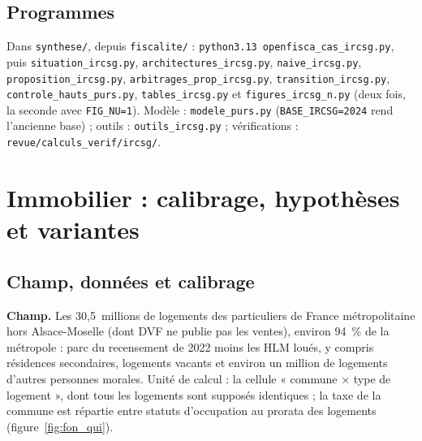 \documentclass[11pt,a4paper]{article}
\begin{document}
\subsection{Programmes}

{\sloppy Dans \texttt{synthese/}, depuis \texttt{fiscalite/} : \texttt{python3.13 openfisca\_cas\_ircsg.py}, puis
\texttt{situation\_ircsg.py}, \texttt{architectures\_ircsg.py}, \texttt{naive\_ircsg.py},
\texttt{proposition\_ircsg.py}, \texttt{arbitrages\_prop\_ircsg.py}, \texttt{transition\_ircsg.py},
\texttt{controle\_hauts\_purs.py}, \texttt{tables\_ircsg.py} et \texttt{figures\_ircsg\_n.py} (deux fois, la seconde
avec \texttt{FIG\_NU=1}). Modèle : \texttt{modele\_purs.py} (\texttt{BASE\_IRCSG=2024} rend l'ancienne base) ;
outils : \texttt{outils\_ircsg.py} ; vérifications : \texttt{revue/calculs\_verif/ircsg/}.\par}

\section{Immobilier : calibrage, hypothèses et variantes}\label{ann:foncier}

\subsection{Champ, données et calibrage}

\textbf{Champ.} Les 30,5~millions de logements des particuliers de France métropolitaine hors Alsace-Moselle (dont DVF
ne publie pas les ventes), environ 94~\% de la métropole : parc du recensement de 2022 moins les HLM loués, y compris
résidences secondaires, logements vacants et environ un million de logements d'autres personnes morales. Unité de calcul :
la cellule « commune × type de logement », dont tous les logements sont supposés identiques ; la taxe de la commune est
répartie entre statuts d'occupation au prorata des logements (figure~\ref{fig:fon_qui}).
\end{document}
